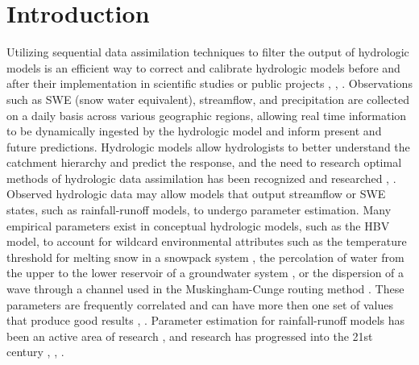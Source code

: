 \chapter{Introduction}



	Utilizing sequential data assimilation techniques to filter the output of hydrologic models is an efficient way to correct and calibrate hydrologic models before and after their implementation in scientific studies or public projects \cite{Reichle2002}, \cite{Moradkhani2005}, \cite{Reichle2008}. Observations such as SWE (snow water equivalent), streamflow, and precipitation are collected on a daily basis across various geographic regions, allowing  real time information to be dynamically ingested by the hydrologic model and inform present and future predictions. Hydrologic models allow hydrologists to better understand the catchment hierarchy and predict the response, and the need to research optimal methods of hydrologic data assimilation has been recognized \cite{Troch2003} and researched \cite{Liu2007}, \cite{Reichle2008}. 
	Observed hydrologic data may allow models that output streamflow or SWE states, such as rainfall-runoff models, to undergo parameter estimation. Many empirical parameters exist in conceptual hydrologic models, such as the HBV model, to account for wildcard environmental attributes such as the temperature threshold for melting snow in a snowpack system \cite{Maneta2008}, the percolation of water from the upper to the lower reservoir of a groundwater system \cite{Maneta2008}, or the dispersion of a wave through a channel used in the Muskingham-Cunge routing method \cite{Montero2016}. These parameters are frequently correlated and can have more then one set of values that produce good results \cite{Jakeman1993}, \cite{Maneta2008}. Parameter estimation for rainfall-runoff models has been an active area of research \cite{Sorooshian1980},\cite{Sorooshian1993} and research has progressed into the 21st century \cite{Moradkhani2005}, \cite{Wagener2006}, \cite{Reichle2008}.
	
